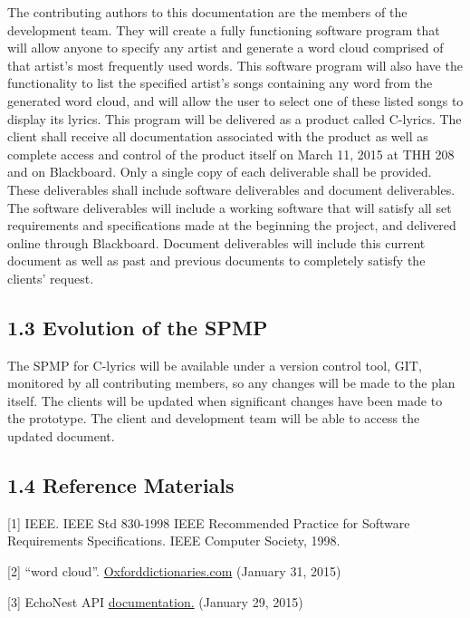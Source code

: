 \documentclass[]{article}
\begin{document}
The contributing authors to this documentation are the members of the
development team. They will create a fully functioning software program
that will allow anyone to specify any artist and generate a word cloud
comprised of that artist's most frequently used words. This software
program will also have the functionality to list the specified artist's
songs containing any word from the generated word cloud, and will allow
the user to select one of these listed songs to display its lyrics. This
program will be delivered as a product called C-lyrics. The client shall
receive all documentation associated with the product as well as
complete access and control of the product itself on March 11, 2015 at
THH 208 and on Blackboard. Only a single copy of each deliverable shall
be provided. These deliverables shall include software deliverables and
document deliverables. The software deliverables will include a working
software that will satisfy all set requirements and specifications made
at the beginning the project, and delivered online through Blackboard.
Document deliverables will include this current document as well as past
and previous documents to completely satisfy the clients' request.

\subsection{1.3 Evolution of the SPMP}\label{evolution-of-the-spmp}

The SPMP for C-lyrics will be available under a version control tool,
GIT, monitored by all contributing members, so any changes will be made
to the plan itself. The clients will be updated when significant changes
have been made to the prototype. The client and development team will be
able to access the updated document.

\subsection{1.4 Reference Materials}\label{reference-materials}

{[}1{]} IEEE. IEEE Std 830-1998 IEEE Recommended Practice for Software
Requirements Specifications. IEEE Computer Society, 1998.

{[}2{]} ``word cloud''.
\href{http://www.oxforddictionaries.com/us/definition/american_english/word-cloud}{Oxforddictionaries.com}
(January 31, 2015)

{[}3{]} EchoNest API
\href{http://developer.echonest.com/docs/v4/index.html\#overview}{documentation.}
(January 29, 2015)
\end{document}
